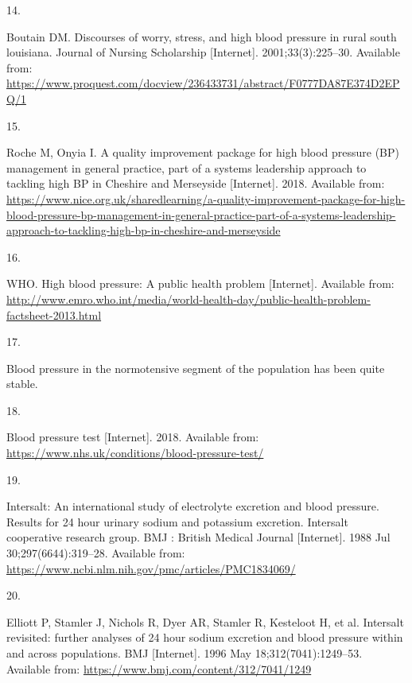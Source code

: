 \documentclass[
]{article}
\newlength{\cslhangindent}
\newlength{\csllabelwidth}
\newlength{\cslentryspacingunit} %
\newenvironment{CSLReferences}[2] %
 {%
  \setlength{\parindent}{0pt}
  \ifodd #1
  \let\oldpar\par
  \def\par{\hangindent=\cslhangindent\oldpar}
  \fi
  \setlength{\parskip}{#2\cslentryspacingunit}
 }%
 {}
\newcommand{\CSLLeftMargin}[1]{\parbox[t]{\csllabelwidth}{#1}}
\newcommand{\CSLRightInline}[1]{\parbox[t]{\linewidth - \csllabelwidth}{#1}\break}
\begin{document}
\begin{CSLReferences}{0}{0}
\leavevmode{}%
\CSLLeftMargin{14. }%
\CSLRightInline{Boutain DM. Discourses of worry, stress, and high blood
pressure in rural south louisiana. Journal of Nursing Scholarship
{[}Internet{]}. 2001;33(3):225--30. Available from:
\url{https://www.proquest.com/docview/236433731/abstract/F0777DA87E374D2EPQ/1}}

\leavevmode{}%
\CSLLeftMargin{15. }%
\CSLRightInline{Roche M, Onyia I. A quality improvement package for high
blood pressure (BP) management in general practice, part of a systems
leadership approach to tackling high BP in Cheshire and Merseyside
{[}Internet{]}. 2018. Available from:
\url{https://www.nice.org.uk/sharedlearning/a-quality-improvement-package-for-high-blood-pressure-bp-management-in-general-practice-part-of-a-systems-leadership-approach-to-tackling-high-bp-in-cheshire-and-merseyside}}

\leavevmode{}%
\CSLLeftMargin{16. }%
\CSLRightInline{WHO. High blood pressure: A public health problem
{[}Internet{]}. Available from:
\url{http://www.emro.who.int/media/world-health-day/public-health-problem-factsheet-2013.html}}

\leavevmode{}%
\CSLLeftMargin{17. }%
\CSLRightInline{Blood pressure in the normotensive segment of the
population has been quite stable. }

\leavevmode{}%
\CSLLeftMargin{18. }%
\CSLRightInline{Blood pressure test {[}Internet{]}. 2018. Available
from: \url{https://www.nhs.uk/conditions/blood-pressure-test/}}

\leavevmode{}%
\CSLLeftMargin{19. }%
\CSLRightInline{Intersalt: An international study of electrolyte
excretion and blood pressure. Results for 24 hour urinary sodium and
potassium excretion. Intersalt cooperative research group. BMJ : British
Medical Journal {[}Internet{]}. 1988 Jul 30;297(6644):319--28. Available
from: \url{https://www.ncbi.nlm.nih.gov/pmc/articles/PMC1834069/}}

\leavevmode{}%
\CSLLeftMargin{20. }%
\CSLRightInline{Elliott P, Stamler J, Nichols R, Dyer AR, Stamler R,
Kesteloot H, et al. Intersalt revisited: further analyses of 24 hour
sodium excretion and blood pressure within and across populations. BMJ
{[}Internet{]}. 1996 May 18;312(7041):1249--53. Available from:
\url{https://www.bmj.com/content/312/7041/1249}}


\end{CSLReferences}
\end{document}

